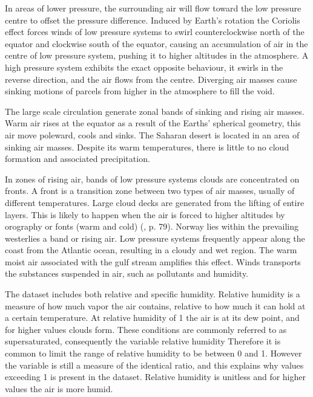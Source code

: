 In areas of lower pressure, the surrounding air will flow toward the low pressure centre to offset the pressure difference. Induced by Earth's rotation the Coriolis effect forces winds of low pressure systems to swirl counterclockwise north of the equator and clockwise south of the equator, causing an accumulation of air in the centre of low pressure system, pushing it to higher altitudes in the atmosphere. A high pressure system exhibits the exact opposite behaviour, it swirls in the reverse direction, and the air flows from the centre. Diverging air masses cause sinking motions of parcels from higher in the atmosphere to fill the void. 

The large scale circulation generate zonal bands of sinking and rising air masses. Warm air rises at the equator as a result of the Earths' spherical geometry, this air move poleward, cools and sinks. The Saharan desert is located in an area of sinking air masses. Despite its warm temperatures, there is little to no cloud formation and associated precipitation. 

In zones of rising air, bands of low pressure systems clouds are concentrated on fronts. A front is a transition zone between two types of air masses, usually of different temperatures. %
Large cloud decks are generated from the lifting of entire layers. This is likely to happen when the air is forced to higher altitudes by orography or fonts (warm and cold) (\cite{lohmann2016}, p. 79). Norway lies within the prevailing westerlies a band or rising air. Low pressure systems frequently appear along the coast from the Atlantic ocean, resulting in a cloudy and wet region. The warm moist air associated with the gulf stream amplifies this effect. Winds transports the substances suspended in air, such as pollutants and humidity. 

The dataset includes both relative and specific humidity. Relative humidity is a measure of how much vapor the air contains, relative to how much it can hold at a certain temperature. At relative humidity of 1 the air is at its dew point, and for higher values clouds form. These conditions are commonly referred to as supersaturated, consequently the variable relative humidity 
Therefore it is common to limit the range of relative humidity to be between 0 and 1. However the variable is still a measure of the identical ratio, and this explains why values exceeding 1 is present in the dataset. Relative humidity is unitless and for higher values the air is more humid.

